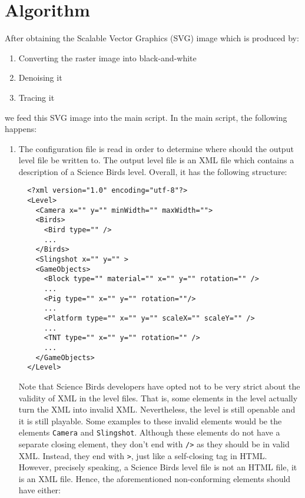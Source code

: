 \documentclass[12pt]{dalthesis}
\begin{document}
\chapter{Algorithm}

After obtaining the Scalable Vector Graphics (SVG) image which is produced by:

\begin{enumerate}
  \item Converting the raster image into black-and-white
  \item Denoising it
  \item Tracing it
\end{enumerate}

we feed this SVG image into the main script. In the main script, the following happens:

\begin{enumerate}
  \item The configuration file is read in order to determine where should the output level file be written to. The output level file is an XML file which contains a description of a Science Birds level. Overall, it has the following structure:

  \begin{lstlisting}
  <?xml version="1.0" encoding="utf-8"?>
  <Level>
    <Camera x="" y="" minWidth="" maxWidth="">
    <Birds>
      <Bird type="" />
      ...
    </Birds>
    <Slingshot x="" y="" >
    <GameObjects>
      <Block type="" material="" x="" y="" rotation="" />
      ...
      <Pig type="" x="" y="" rotation=""/>
      ...
      <Platform type="" x="" y="" scaleX="" scaleY="" />
      ...
      <TNT type="" x="" y="" rotation="" />
      ...
    </GameObjects>
  </Level>
  \end{lstlisting}

  Note that Science Birds developers have opted not to be very strict about the validity of XML in the level files. That is, some elements in the level actually turn the XML into invalid XML. Nevertheless, the level is still openable and it is still playable. Some examples to these invalid elements would be the elements \lstinline{Camera} and \lstinline{Slingshot}. Although these elements do not have a separate closing element, they don't end with \lstinline{/>} as they should be in valid XML. Instead, they end with \lstinline{>}, just like a self-closing tag in HTML. However, precisely speaking, a Science Birds level file is not an HTML file, it is an XML file. Hence, the aforementioned non-conforming elements should have either:


\end{enumerate}
\end{document}

